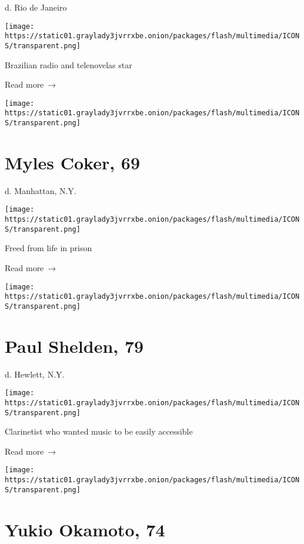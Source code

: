 d. Rio de Janeiro

\texttt{[image: https://static01.graylady3jvrrxbe.onion/packages/flash/multimedia/ICONS/transparent.png]}

Brazilian radio and telenovelas star

 Read more~→

\href{https://www.nytimes3xbfgragh.onion/2020/05/08/nyregion/myles-coker-dead-coronavirus.html}{}

\texttt{[image: https://static01.graylady3jvrrxbe.onion/packages/flash/multimedia/ICONS/transparent.png]}

\hypertarget{myles-coker-69}{%
\section{Myles Coker, 69}\label{myles-coker-69}}

d. Manhattan, N.Y.

\texttt{[image: https://static01.graylady3jvrrxbe.onion/packages/flash/multimedia/ICONS/transparent.png]}

Freed from life in prison

 Read more~→

\href{https://www.nytimes3xbfgragh.onion/2020/05/08/obituaries/paul-shelden-dead-coronavirus.html}{}

\texttt{[image: https://static01.graylady3jvrrxbe.onion/packages/flash/multimedia/ICONS/transparent.png]}

\hypertarget{paul-shelden-79}{%
\section{Paul Shelden, 79}\label{paul-shelden-79}}

d. Hewlett, N.Y.

\texttt{[image: https://static01.graylady3jvrrxbe.onion/packages/flash/multimedia/ICONS/transparent.png]}

Clarinetist who wanted music to be easily accessible

 Read more~→

\href{https://www.nytimes3xbfgragh.onion/2020/05/08/obituaries/yukio-okamoto-coronavirus-dead.html}{}

\texttt{[image: https://static01.graylady3jvrrxbe.onion/packages/flash/multimedia/ICONS/transparent.png]}

\hypertarget{yukio-okamoto-74}{%
\section{Yukio Okamoto, 74}\label{yukio-okamoto-74}}


